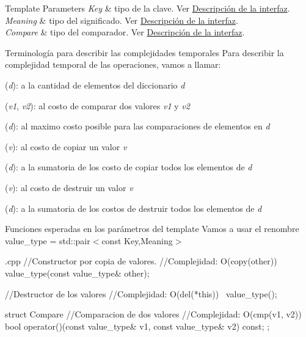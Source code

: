 \begin{DoxyTemplParams}{\-Template Parameters}
{\em \-Key} & tipo de la clave. \-Ver \hyperlink{Interfaz}{\-Descripción de la interfaz}. \\
\hline
{\em \-Meaning} & tipo del significado. \-Ver \hyperlink{Interfaz}{\-Descripción de la interfaz}. \\
\hline
{\em \-Compare} & tipo del comparador. \-Ver \hyperlink{Interfaz}{\-Descripción de la interfaz}.\\
\hline
\end{DoxyTemplParams}
\begin{DoxyParagraph}{\-Terminología para describir las complejidades temporales}
\-Para describir la complejidad temporal de las operaciones, vamos a llamar\-:
\begin{DoxyItemize}
\item ({\itshape d\/})\-: a la cantidad de elementos del diccionario {\itshape d\/} 
\item ({\itshape v1\/}, {\itshape v2\/})\-: al costo de comparar dos valores {\itshape v1\/} y {\itshape v2\/} 
\item ({\itshape d\/})\-: al maximo costo posible para las comparaciones de elementos en {\itshape d\/} 
\item ({\itshape v\/})\-: al costo de copiar un valor {\itshape v\/} 
\item ({\itshape d\/})\-: a la sumatoria de los costo de copiar todos los elementos de {\itshape d\/} 
\item ({\itshape v\/})\-: al costo de destruir un valor {\itshape v\/} 
\item ({\itshape d\/})\-: a la sumatoria de los costos de destruir todos los elementos de {\itshape d\/} 
\end{DoxyItemize}
\end{DoxyParagraph}
\begin{DoxyParagraph}{\-Funciones esperadas en los parámetros del template}
\-Vamos a usar el renombre value\-\_\-type = std\-::pair$<$const Key,\-Meaning$>$
\end{DoxyParagraph}

\begin{DoxyCode}
 {.cpp}
 //Constructor por copia de valores.
 //Complejidad: O(copy(other))
 value_type(const value_type& other);

 //Destructor de los valores
 //Complejidad: O(del(*this))
 ~value_type();

 struct Compare {
   //Comparacion de dos valores
   //Complejidad: O(cmp(v1, v2))
   bool operator()(const value_type& v1, const value_type& v2) const;
 };
\end{DoxyCode}
 


